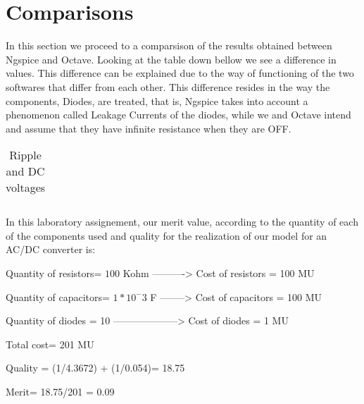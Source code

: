 \section{Comparisons}
\label{sec:comparsisons}

In this section we proceed to a comparsison of the results obtained between Ngspice and Octave. Looking at the table down bellow we see a difference in values. This difference can be explained due to the way of functioning of the two softwares that differ from each other. This difference resides in the way the components, Diodes, are treated, that is, Ngspice takes into account a phenomenon called Leakage Currents of the diodes, while we and Octave intend and assume that they have infinite resistance when they are OFF. 

\FloatBarrier
\begin{table}[h]
  \centering
  \begin{tabular}{|c|c|c|c|c|c|c|}
    \hline    
    
    \hline
  \end{tabular}
  \caption{Ripple and DC voltages}
  \label{tab:Octave}
\end{table}
\FloatBarrier 


In this laboratory assignement, our merit value, according to the quantity of each of the components used and quality for the realization of our model for an AC/DC converter is: 

\par Quantity of resistors= $100$ Kohm ----------> Cost of resistors = 100 MU 
\par Quantity of capacitors= $1*10^-3$ F --------> Cost of capacitors = 100 MU 
\par Quantity of diodes = 10 --------------------> Cost of diodes = 1 MU  
\par Total cost= 201 MU

\par Quality = (1/4.3672) + (1/0.054)= 18.75 

\par Merit= 18.75/201 = 0.09

